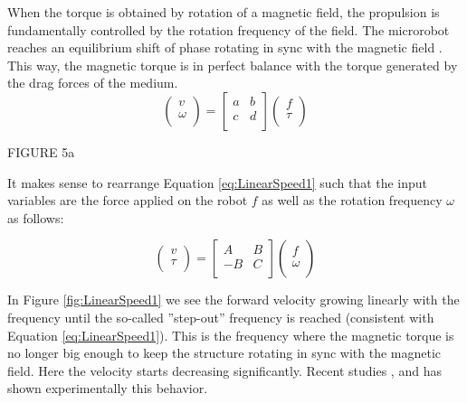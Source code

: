 When the torque is obtained by rotation of a magnetic field, the propulsion is fundamentally controlled by the rotation frequency of the field. The microrobot reaches an equilibrium shift of phase rotating in sync with the magnetic field . This way, the magnetic torque is in perfect balance with the torque generated by the drag forces of the medium. \\


\begin{equation}\label{eq:LinearSpeed1}
\left(\begin{array}{c}
v \\
\omega \\
\end{array}\right) =
\left[\begin{array}{cc}
a & b \\
c & d \\
\end{array}\right] \left(\begin{array}{c}
f \\
\tau \\
\end{array}\right)
\end{equation}

FIGURE 5a

It makes sense to rearrange Equation \ref{eq:LinearSpeed1}  such that the input variables are the force applied on the robot $f$ as well as the rotation frequency $\omega$ as follows:

\begin{equation}
\left(\begin{array}{c}
v \\
\tau \\
\end{array}\right) =
\left[\begin{array}{cc}
A & B \\
-B & C \\
\end{array}\right] \left(\begin{array}{c}
f \\
\omega \\
\end{array}\right)
\end{equation}

In Figure \ref{fig:LinearSpeed1}  we see the forward velocity growing linearly with the frequency until the so-called ''step-out'' frequency is reached (consistent with Equation \ref{eq:LinearSpeed1}). This is the frequency where the magnetic torque is no longer big enough to keep the structure rotating in sync with the magnetic field. Here the velocity starts decreasing significantly. Recent studies  \cite{Peyer2013}, \cite{Morozov2014} and \cite{Morozov2014a} has shown experimentally this behavior. \\

